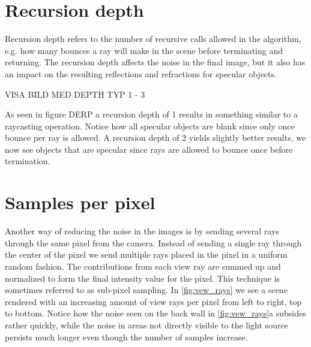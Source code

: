 \documentclass[]{report}   %
\begin{document}
\section{Recursion depth}
Recursion depth refers to the number of recursive calls allowed in the algorithm, e.g. how many bounces a ray will make in the scene before terminating and returning. 
The recursion depth affects the noise in the final image, but it also has an impact on the resulting reflections and refractions for specular objects.

VISA BILD MED DEPTH TYP 1 - 3

As seen in figure DERP a recursion depth of 1 results in something similar to a raycasting operation. 
Notice how all specular objects are blank since only once bounce per ray is allowed. 
A recursion depth of 2 yields slightly better results, we now see objects that are specular since rays are allowed to bounce once before termination.

\section{Samples per pixel}
Another way of reducing the noise in the images is by sending several rays through the same pixel from the camera. 
Instead of sending a single ray through the center of the pixel we send multiple rays placed in the pixel in a uniform random fashion. 
The contributions from each view ray are summed up and normalized to form the final intensity value for the pixel. 
This technique is sometimes referred to as sub-pixel sampling. In \autoref{fig:vew_rays} we see a scene rendered with an increasing amount of view rays per pixel from left to right, top to bottom. 
Notice how the noise seen on the back wall in \autoref{fig:vew_rays}a subsides rather quickly, while the noise in areas not directly visible to the light source persists much longer even though the number of samples increase.
\end{document}
